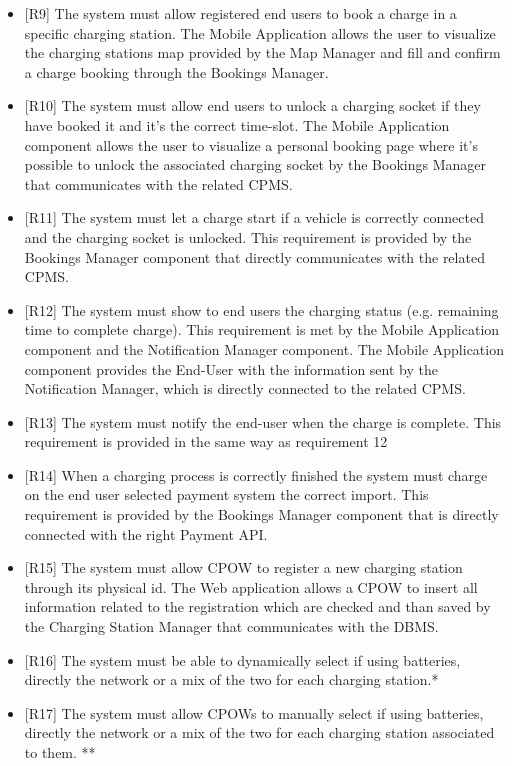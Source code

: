 \documentclass[a4paper]{report}
\begin{document}
\begin{itemize}
    \item{[R9]} \label{R9} The system must allow registered end users to book a charge in a specific charging station. The Mobile Application allows the user to visualize the charging stations map provided by the Map Manager and fill and confirm a charge booking through the Bookings Manager.
    \item{[R10]} \label{R10} The system must allow end users to unlock a charging socket if they have booked it and it's the correct time-slot. The Mobile Application component allows the user to visualize a personal booking page where it's possible to unlock the associated charging socket by the Bookings Manager that communicates with the related CPMS.
    \item{[R11]} \label{R11} The system must let a charge start if a vehicle is correctly connected and the charging socket is unlocked. This requirement is provided by the Bookings Manager component that directly communicates with the related CPMS.
    \item{[R12]} \label{R12} The system must show to end users the charging status (e.g. remaining time to complete charge). This requirement is met by the Mobile Application component and the Notification Manager component. The Mobile Application component provides the End-User with the information sent by the Notification Manager, which is directly connected to the related CPMS.
    \item{[R13]} \label{R13} The system must notify the end-user when the charge is complete. This requirement is provided in the same way as requirement 12
    \item{[R14]} \label{R14} When a charging process is correctly finished the system must charge on the end user selected payment system the correct import. This requirement is provided by the Bookings Manager component that is directly connected with the right Payment API.
    \item{[R15]} \label{R15} The system must allow CPOW to register a new charging station through its physical id. The Web application allows a CPOW to insert all information related to the registration which are checked and than saved by the Charging Station Manager that communicates with the DBMS.
    \item{[R16]} \label{R16} The system must be able to dynamically select if using batteries, directly the network or a mix of the two for each charging station.*
    \item{[R17]} \label{R17} The system must allow CPOWs to manually select if using batteries, directly the network or a mix of the two for each charging station associated to them. **

\end{itemize}
\end{document}
